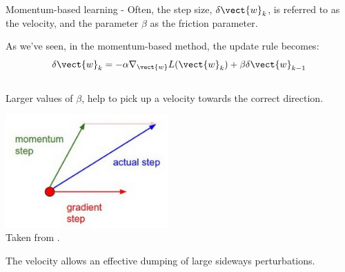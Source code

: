 \begin{frame}[t,allowframebreaks]{
    Momentum-based learning -}
    Often, the step size, $\delta \vect{w}_{k}$, is referred to as the 
    \gls{velocity},
    and the parameter $\beta$ as the 
    \gls{friction parameter}.\\

    \framebreak


    As we've seen, in the \gls{momentum}-based method,
    the update rule becomes: 
    \begin{equation*}
        \delta \vect{w}_{k} = 
          - \alpha \nabla_{\vect{w}} L(\vect{w}_{k})
          + \beta \delta \vect{w}_{k-1}
    \end{equation*}
    
    \begin{columns}[t]
        \begin{column}{0.60\textwidth}
            Larger values of 
            $\beta$, help to pick up a 
            \gls{velocity} 
            towards the correct direction.\\
            \begin{center}
                \includegraphics[width=0.50\textwidth]
                    {./images/training_issues/cs231n_momentum_update.png}\\
                {\tiny 
                    \color{col:attribution} 
                    Taken from \cite{CS231n}.\\    
                }
            \end{center}                
            The \gls{velocity} allows an effective 
            dumping of large sideways perturbations.\\        
        \end{column}
        \begin{column}{0.40\textwidth}
            \vspace{-0.5cm}
            \begin{center}

\end{center}
\end{column}
\end{columns}
\end{frame}
